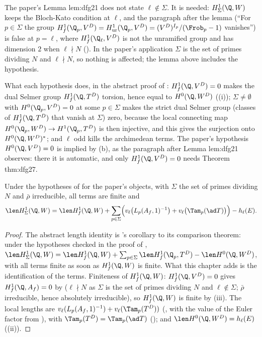 \begin{paperlink}
The paper's Lemma lem:dfg21 does not state $\ell\notin\Sigma$. It is needed: $H^1_\Sigma(\Q,W)$ keeps the Bloch-Kato condition at $\ell$, and the paragraph after the lemma
(``For $p\in\Sigma$ the group $H^1_f(\Q_p,V^D)=H^1_{\mathrm{ur}}(\Q_p,V^D)=(V^D)^{I_p}/(\Frob_p-1)$ vanishes'') is false at $p=\ell$, where $H^1_f(\Q_\ell,V^D)$ is not the
unramified group and has dimension $2$ when $\ell\nmid N$ (). In the paper's application $\Sigma$ is the set of primes dividing $N$ and
$\ell\nmid N$, so nothing is affected; the lemma above includes the hypothesis.
\end{paperlink}

What each hypothesis does, in the abstract proof of : $H^1_f(\Q,V^D)=0$ makes the dual Selmer group $H^1_f(\Q,T^D)$ torsion, hence equal to
$H^0(\Q,W^D)$ ((i)); $\Sigma\ne\emptyset$ with $H^0(\Q_p,V^D)=0$ at some $p\in\Sigma$ makes the strict dual Selmer group (classes of $H^1_f(\Q,T^D)$ that vanish
at $\Sigma$) zero, because the local connecting map $H^0(\Q_p,W^D)\to H^1(\Q_p,T^D)$ is then injective, and this gives the surjection onto $H^0(\Q,W^D)^*$; and $\ell$ odd kills
the archimedean terms. The paper's hypothesis $H^0(\Q,V^D)=0$ is implied by (b), as the paragraph after Lemma lem:dfg21 observes: there it is automatic, and only
$H^1_f(\Q,V^D)=0$ needs Theorem thm:dfg27.

\begin{corollary}\label{cor:blochkato:length-identity}
Under the hypotheses of  for the paper's objects, with $\Sigma$ the set of primes dividing $N$ and $\bar\rho$ irreducible, all terms are finite and
\[
\len H^1_\Sigma(\Q,W)=\len H^1_f(\Q,W)+\sum_{p\in\Sigma}\Bigl(v_\ell\bigl(L_p(A_f,1)^{-1}\bigr)+v_\ell\bigl(\Tam_p(\ad T)\bigr)\Bigr)-h_\ell(E).
\]
\end{corollary}

\begin{proof}
The abstract length identity is 's corollary to its comparison theorem: under the hypotheses checked in the proof of ,
$\len H^1_\Sigma(\Q,W)=\len H^1_f(\Q,W)+\sum_{p\in\Sigma}\len H^1_f(\Q_p,T^D)-\len H^0(\Q,W^D)$, with all terms finite as soon as $H^1_f(\Q,W)$ is finite. What this chapter adds is
the identification of the terms. Finiteness of $H^1_f(\Q,W)$: $H^1_f(\Q,V^D)=0$ gives $H^1_f(\Q,A_f)=0$ by  ($\ell\nmid N$ as
$\Sigma$ is the set of primes dividing $N$ and $\ell\notin\Sigma$; $\bar\rho$ irreducible, hence absolutely irreducible), so $H^1_f(\Q,W)$ is finite by
(iii). The local lengths are $v_\ell(L_p(A_f,1)^{-1})+v_\ell(\Tam_p(T^D))$ (, with the value of the Euler factor
from ), with $\Tam_p(T^D)=\Tam_p(\ad T)$ (); and $\len H^0(\Q,W^D)=h_\ell(E)$ ((ii)).
\end{proof}

